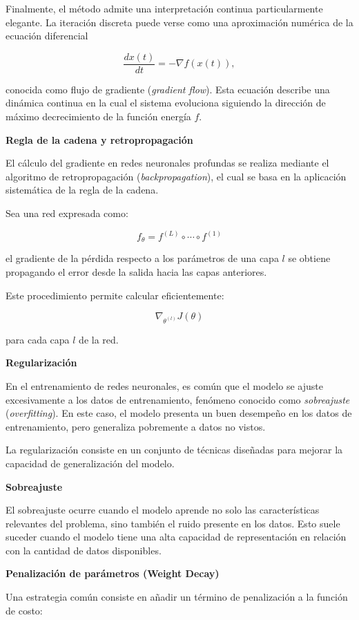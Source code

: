 \documentclass[
  spanish,
  us-letterpaper,
  DIV=11,
  numbers=noendperiod]{scrreprt}
\begin{document}
Finalmente, el método admite una interpretación continua particularmente
elegante. La iteración discreta puede verse como una aproximación
numérica de la ecuación diferencial

\[
\frac{dx(t)}{dt}
=
-\nabla f(x(t)),
\]

conocida como flujo de gradiente (\emph{gradient flow}). Esta ecuación
describe una dinámica continua en la cual el sistema evoluciona
siguiendo la dirección de máximo decrecimiento de la función energía
\(f\).

\textbf{Regla de la cadena y retropropagación}

El cálculo del gradiente en redes neuronales profundas se realiza
mediante el algoritmo de retropropagación (\emph{backpropagation}), el
cual se basa en la aplicación sistemática de la regla de la cadena.

Sea una red expresada como:

\[
f_\theta = f^{(L)} \circ \cdots \circ f^{(1)}
\]

el gradiente de la pérdida respecto a los parámetros de una capa \(l\)
se obtiene propagando el error desde la salida hacia las capas
anteriores.

Este procedimiento permite calcular eficientemente:

\[
\nabla_{\theta^{(l)}} J(\theta)
\]

para cada capa \(l\) de la red.

\textbf{Regularización}

En el entrenamiento de redes neuronales, es común que el modelo se
ajuste excesivamente a los datos de entrenamiento, fenómeno conocido
como \emph{sobreajuste} (\emph{overfitting}). En este caso, el modelo
presenta un buen desempeño en los datos de entrenamiento, pero
generaliza pobremente a datos no vistos.

La regularización consiste en un conjunto de técnicas diseñadas para
mejorar la capacidad de generalización del modelo.

\textbf{Sobreajuste}

El sobreajuste ocurre cuando el modelo aprende no solo las
características relevantes del problema, sino también el ruido presente
en los datos. Esto suele suceder cuando el modelo tiene una alta
capacidad de representación en relación con la cantidad de datos
disponibles.

\textbf{Penalización de parámetros (Weight Decay)}

Una estrategia común consiste en añadir un término de penalización a la
función de costo:
\end{document}
